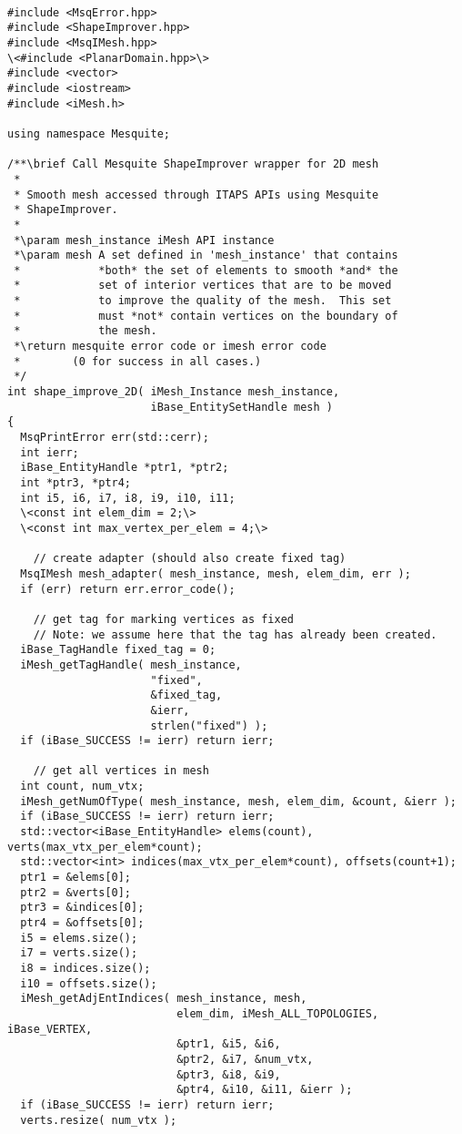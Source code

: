 \begin{lstlisting}

#include <MsqError.hpp>
#include <ShapeImprover.hpp>
#include <MsqIMesh.hpp>
\<#include <PlanarDomain.hpp>\>
#include <vector>
#include <iostream>
#include <iMesh.h>

using namespace Mesquite;

/**\brief Call Mesquite ShapeImprover wrapper for 2D mesh
 *
 * Smooth mesh accessed through ITAPS APIs using Mesquite
 * ShapeImprover.
 *
 *\param mesh_instance iMesh API instance
 *\param mesh A set defined in 'mesh_instance' that contains
 *            *both* the set of elements to smooth *and* the
 *            set of interior vertices that are to be moved
 *            to improve the quality of the mesh.  This set
 *            must *not* contain vertices on the boundary of
 *            the mesh.
 *\return mesquite error code or imesh error code
 *        (0 for success in all cases.)
 */
int shape_improve_2D( iMesh_Instance mesh_instance,
                      iBase_EntitySetHandle mesh )
{
  MsqPrintError err(std::cerr);
  int ierr;
  iBase_EntityHandle *ptr1, *ptr2;
  int *ptr3, *ptr4;
  int i5, i6, i7, i8, i9, i10, i11;
  \<const int elem_dim = 2;\>
  \<const int max_vertex_per_elem = 4;\>
  
    // create adapter (should also create fixed tag)
  MsqIMesh mesh_adapter( mesh_instance, mesh, elem_dim, err );
  if (err) return err.error_code();

    // get tag for marking vertices as fixed
    // Note: we assume here that the tag has already been created.
  iBase_TagHandle fixed_tag = 0;
  iMesh_getTagHandle( mesh_instance,
                      "fixed",
                      &fixed_tag,
                      &ierr,
                      strlen("fixed") );
  if (iBase_SUCCESS != ierr) return ierr;

    // get all vertices in mesh
  int count, num_vtx;
  iMesh_getNumOfType( mesh_instance, mesh, elem_dim, &count, &ierr );
  if (iBase_SUCCESS != ierr) return ierr;
  std::vector<iBase_EntityHandle> elems(count), verts(max_vtx_per_elem*count);
  std::vector<int> indices(max_vtx_per_elem*count), offsets(count+1);
  ptr1 = &elems[0];
  ptr2 = &verts[0];
  ptr3 = &indices[0];
  ptr4 = &offsets[0];
  i5 = elems.size();
  i7 = verts.size();
  i8 = indices.size();
  i10 = offsets.size();
  iMesh_getAdjEntIndices( mesh_instance, mesh, 
                          elem_dim, iMesh_ALL_TOPOLOGIES, iBase_VERTEX,
                          &ptr1, &i5, &i6,
                          &ptr2, &i7, &num_vtx,
                          &ptr3, &i8, &i9,
                          &ptr4, &i10, &i11, &ierr );
  if (iBase_SUCCESS != ierr) return ierr;
  verts.resize( num_vtx );


\end{lstlisting}
